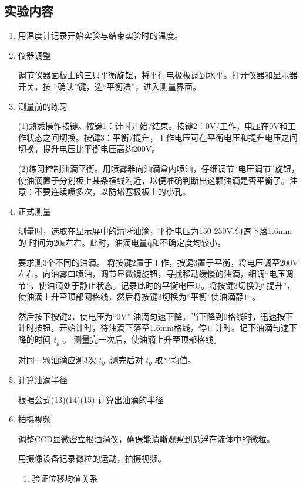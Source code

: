\documentclass[12pt,a4paper,UTF8]{ctexart}
\begin{document}
\subsection*{实验内容}
\begin{enumerate}
    \item 用温度计记录开始实验与结束实验时的温度。
    \item 仪器调整

	调节仪器面板上的三只平衡旋钮，将平行电极板调到水平。打开仪器和显示器开关，按
“确认”键，选“平衡法”，进入测量界面。

    \item 测量前的练习

(1)熟悉操作按键。按键1：计时开始/结束。按键2：0V/工作，电压在0V和工作状态之间切换。按键3：平衡/提升，工作电压可在平衡电压和提升电压之间切换，提升电压比平衡电压高约200V。

(2)练习控制油滴平衡。用喷雾器向油滴盒内喷油，仔细调节“电压调节”旋钮，使油滴置于分划板上某条横线附近，以便准确判断出这颗油滴是否平衡了。注意：不要连续喷多次，以防堵塞极板上的小孔。
    \item 正式测量

测量时，选取在显示屏中的清晰油滴，平衡电压为150-250V,匀速下落1.6mm的
时间为20s左右。此时，油滴电量q和不确定度均较小。

要求测3个不同的油滴。
将按键2置于工作，按键3置于平衡，将电压调至200V左右。向油雾口喷油，调节显微镜旋钮，寻找移动缓慢的油滴，细调“电压调节”，使油滴处于静止状态。记录此时的平衡电压U。将按键3切换为“提升”，使油滴上升至顶部网格线，然后将按键3切换为“平衡”使油滴静止。

然后按下按键2，使电压为“0V”,油滴匀速下降。当下降到0格线时，迅速按下计时按钮，开始计时，待油滴下落至1.6mm格线，停止计时。记下油滴匀速下降的时间 $t_g$ 。
测量完一次后，使油滴上升至顶部格线。

对同一颗油滴应测3次 $t_g$ ,测完后对 $t_g$ 取平均值。

	\item 计算油滴半径

根据公式(13)(14)(15)
计算出油滴的半径

	\item 拍摄视频

	调整CCD显微密立根油滴仪，确保能清晰观察到悬浮在流体中的微粒。

	用摄像设备记录微粒的运动，拍摄视频。

	\begin{enumerate}[label=\roman*.]
            \item 验证位移均值关系


\end{enumerate}
\end{enumerate}
\end{document}
